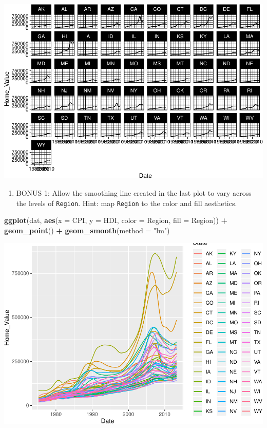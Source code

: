 \documentclass[]{book}
\newenvironment{Shaded}{\begin{snugshade}}{\end{snugshade}}
\newcommand{\DataTypeTok}[1]{\textcolor[rgb]{0.13,0.29,0.53}{#1}}
\newcommand{\KeywordTok}[1]{\textcolor[rgb]{0.13,0.29,0.53}{\textbf{#1}}}
\newcommand{\NormalTok}[1]{#1}
\newcommand{\OperatorTok}[1]{\textcolor[rgb]{0.81,0.36,0.00}{\textbf{#1}}}
\newcommand{\StringTok}[1]{\textcolor[rgb]{0.31,0.60,0.02}{#1}}
\providecommand{\tightlist}{%
  \setlength{\itemsep}{0pt}\setlength{\parskip}{0pt}}
\begin{document}
\includegraphics{R/Rgraphics/figures/unnamed-chunk-179-1.pdf}

\begin{enumerate}
\def\labelenumi{\arabic{enumi}.}
\setcounter{enumi}{4}
\tightlist
\item
  BONUS 1: Allow the smoothing line created in the last plot to vary across the levels of \texttt{Region}. Hint: map \texttt{Region} to the color and fill aesthetics.
\end{enumerate}

\begin{Shaded}
\begin{Highlighting}[]
\KeywordTok{ggplot}\NormalTok{(dat, }\KeywordTok{aes}\NormalTok{(}\DataTypeTok{x =}\NormalTok{ CPI, }\DataTypeTok{y =}\NormalTok{ HDI, }\DataTypeTok{color =}\NormalTok{ Region, }\DataTypeTok{fill =}\NormalTok{ Region)) }\OperatorTok{+}
\StringTok{  }\KeywordTok{geom_point}\NormalTok{() }\OperatorTok{+}
\StringTok{  }\KeywordTok{geom_smooth}\NormalTok{(}\DataTypeTok{method =} \StringTok{"lm"}\NormalTok{)}
\end{Highlighting}
\end{Shaded}

\includegraphics{R/Rgraphics/figures/unnamed-chunk-180-1.pdf}
\end{document}
